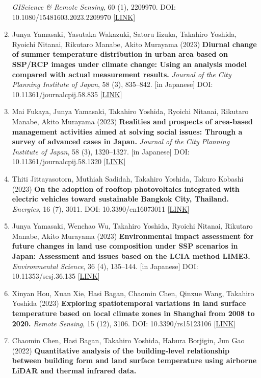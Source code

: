 \documentclass[
]{book}
\begin{document}
\begin{enumerate}
  \emph{GIScience \& Remote Sensing}, 60 (1), 2209970.
  DOI: 10.1080/15481603.2023.2209970 {[}\href{https://www.tandfonline.com/doi/full/10.1080/15481603.2023.2209970}{LINK}{]}
\item
  Junya Yamasaki, Yasutaka Wakazuki, Satoru Iizuka, Takahiro Yoshida, Ryoichi Nitanai, Rikutaro Manabe, Akito Murayama (2023)
  \textbf{Diurnal change of summer temperature distribution in urban area based on SSP/RCP images under climate change: Using an analysis model compared with actual measurement results.}
  \emph{Journal of the City Planning Institute of Japan}, 58 (3), 835--842. {[}in Japanese{]}
  DOI: 10.11361/journalcpij.58.835 {[}\href{https://doi.org/10.11361/journalcpij.58.835}{LINK}{]}
\item
  Mai Fukaya, Junya Yamasaki, Takahiro Yoshida, Ryoichi Nitanai, Rikutaro Manabe, Akito Murayama (2023)
  \textbf{Realities and prospects of area-based management activities aimed at solving social issues: Through a survey of advanced cases in Japan.}
  \emph{Journal of the City Planning Institute of Japan}, 58 (3), 1320--1327. {[}in Japanese{]}
  DOI: 10.11361/journalcpij.58.1320 {[}\href{https://doi.org/10.11361/journalcpij.58.1320}{LINK}{]}
\item
  Thiti Jittayasotorn, Muthiah Sadidah, Takahiro Yoshida, Takuro Kobashi (2023)
  \textbf{On the adoption of rooftop photovoltaics integrated with electric vehicles toward sustainable Bangkok City, Thailand.}
  \emph{Energies}, 16 (7), 3011.
  DOI: 10.3390/en16073011 {[}\href{https://www.mdpi.com/1996-1073/16/7/3011}{LINK}{]}
\item
  Junya Yamasaki, Wenchao Wu, Takahiro Yoshida, Ryoichi Nitanai, Rikutaro Manabe, Akito Murayama (2023)
  \textbf{Environmental impact assessment for future changes in land use composition under SSP scenarios in Japan: Assessment and issues based on the LCIA method LIME3.}
  \emph{Environmental Science}, 36 (4), 135--144. {[}in Japanese{]}
  DOI: 10.11353/sesj.36.135 {[}\href{https://doi.org/10.11353/sesj.36.135}{LINK}{]}
\item
  Xinyan Hou, Xuan Xie, Hasi Bagan, Chaomin Chen, Qinxue Wang,
  Takahiro Yoshida (2023)
  \textbf{Exploring spatiotemporal variations in land surface temperature based on local climate zones in Shanghai from 2008 to 2020.}
  \emph{Remote Sensing}, 15 (12), 3106.
  DOI: 10.3390/rs15123106 {[}\href{https://www.mdpi.com/2072-4292/15/12/3106}{LINK}{]}
\item
  Chaomin Chen, Hasi Bagan, Takahiro Yoshida, Habura Borjigin, Jun Gao (2022)
  \textbf{Quantitative analysis of the building-level relationship between building form and land surface temperature using airborne LiDAR and thermal infrared data.}

\end{enumerate}
\end{document}
